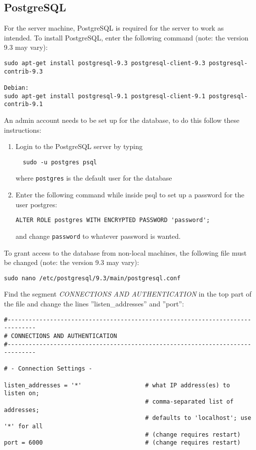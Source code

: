 \subsection{PostgreSQL}
For the server machine, PostgreSQL is required for the server to work as intended. To install PostgreSQL, enter the following command (note: the version 9.3 may vary):
\begin{verbatim}
sudo apt-get install postgresql-9.3 postgresql-client-9.3 postgresql-contrib-9.3 

Debian:
sudo apt-get install postgresql-9.1 postgresql-client-9.1 postgresql-contrib-9.1
\end{verbatim}

An admin account needs to be set up for the database, to do this follow these instructions:

\begin{enumerate}
\item Login to the PostgreSQL server by typing \begin{verbatim}  sudo -u postgres psql \end{verbatim}
where \texttt{postgres} is the default user for the database
\item Enter the following command while inside psql to set up a password for the user postgres:
\begin{verbatim}
ALTER ROLE postgres WITH ENCRYPTED PASSWORD 'password';
\end{verbatim}
and change \texttt{password} to whatever password is wanted.
\end{enumerate}

To grant access to the database from non-local machines, the following file must be changed (note: the version 9.3 may vary):
\begin{verbatim}
sudo nano /etc/postgresql/9.3/main/postgresql.conf
\end{verbatim}
Find the segment \emph{CONNECTIONS AND AUTHENTICATION} in the top part of the file and change the lines ''listen\_addresses'' and ''port'':

\begin{verbatim}
#------------------------------------------------------------------------------
# CONNECTIONS AND AUTHENTICATION
#------------------------------------------------------------------------------

# - Connection Settings -

listen_addresses = '*'          	    # what IP address(es) to listen on;
                                        # comma-separated list of addresses;
                                        # defaults to 'localhost'; use '*' for all
                                        # (change requires restart)
port = 6000                             # (change requires restart)

\end{verbatim}

